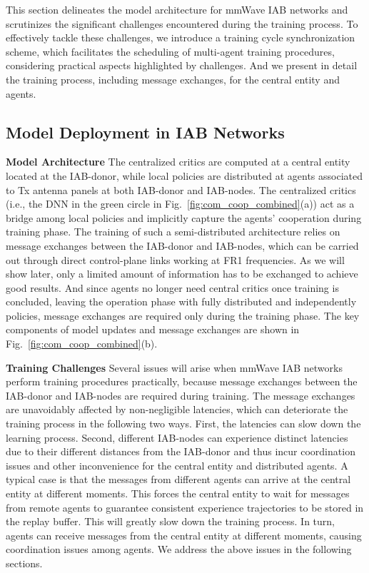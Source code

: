 \label{com_coo_scheme}



This section delineates the model architecture for mmWave IAB networks and scrutinizes the significant challenges encountered during the training process. To effectively tackle these challenges, we introduce a training cycle synchronization scheme, which facilitates the scheduling of multi-agent training procedures, considering practical aspects highlighted by challenges.
And we present in detail the training process, including message exchanges, for the central entity and agents.

\vspace{-10pt}
\subsection{Model Deployment in IAB Networks}

\textbf{Model Architecture}
The centralized critics are computed at a central entity located at the IAB-donor, while local policies are distributed at agents associated to Tx antenna panels at both IAB-donor and IAB-nodes. The centralized critics (i.e., the DNN in the green circle in Fig.~\ref{fig:com_coop_combined}(a)) act as a bridge among local policies and implicitly capture the agents' cooperation during training phase. The training of such a semi-distributed architecture relies on message exchanges between the IAB-donor and IAB-nodes, which can be carried out through direct control-plane links working at FR1 frequencies. As we will show later, only a limited amount of information has to be exchanged to achieve good results.
And since agents no longer need central critics once training is concluded, leaving the operation phase with fully distributed and independently policies, message exchanges are required only during the training phase. The key components of model updates and message exchanges are shown in Fig.~\ref{fig:com_coop_combined}(b).

\textbf{Training Challenges}
Several issues will arise when mmWave IAB networks perform training procedures practically, because message exchanges between the IAB-donor and IAB-nodes are required during training.
The message exchanges are unavoidably affected by non-negligible latencies, which can deteriorate the training process in the following two ways. First, the latencies can slow down the learning process. Second, different IAB-nodes can experience distinct latencies due to their different distances from the IAB-donor and thus incur coordination issues and other inconvenience for the central entity and distributed agents. A typical case is that the messages from different agents can arrive at the central entity at different moments. This forces the central entity to wait for messages from remote agents to guarantee consistent experience trajectories to be stored in the replay buffer. This will greatly slow down the training process. In turn, agents can receive messages from the central entity at different moments, causing coordination issues among agents. We address the above issues in the following sections.

